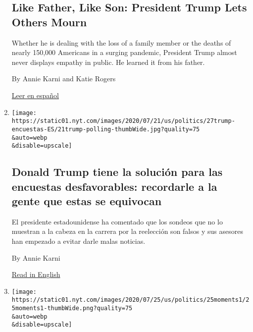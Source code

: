 \begin{enumerate}
  \hypertarget{like-father-like-son-president-trump-lets-others-mourn}{%
  \subsection{Like Father, Like Son: President Trump Lets Others
  Mourn}\label{like-father-like-son-president-trump-lets-others-mourn}}

  Whether he is dealing with the loss of a family member or the deaths
  of nearly 150,000 Americans in a surging pandemic, President Trump
  almost never displays empathy in public. He learned it from his
  father.

  By Annie Karni and Katie Rogers

  \href{https://www.nytimes.com/es/2020/07/31/espanol/estados-unidos/fred-trump-donald-trump.html}{Leer
  en español}
\item
  \href{/es/2020/07/27/espanol/estados-unidos/Trump-encuestas-elecciones.html}{}

  \texttt{[image: https://static01.nyt.com/images/2020/07/21/us/politics/27trump-encuestas-ES/21trump-polling-thumbWide.jpg?quality=75\\\&auto=webp\\\&disable=upscale]}

  \hypertarget{donald-trump-tiene-la-soluciuxf3n-para-las-encuestas-desfavorables-recordarle-a-la--gente-que-estas-se-equivocan}{%
  \subsection{Donald Trump tiene la solución para las encuestas
  desfavorables: recordarle a la~ gente que estas se
  equivocan}\label{donald-trump-tiene-la-soluciuxf3n-para-las-encuestas-desfavorables-recordarle-a-la--gente-que-estas-se-equivocan}}

  El presidente estadounidense ha comentado que los sondeos que no lo
  muestran a la cabeza en la carrera por la reelección son falsos y sus
  asesores han empezado a evitar darle malas noticias.

  By Annie Karni

  \href{https://www.nytimes.com/2020/07/22/us/politics/trump-polls-2020.html}{Read
  in English}
\item
  \href{/2020/07/25/us/politics/trump-biden-polls-coronavirus.html}{}

  \texttt{[image: https://static01.nyt.com/images/2020/07/25/us/politics/25moments1/25moments1-thumbWide.png?quality=75\\\&auto=webp\\\&disable=upscale]}

  \hypertarget{president-trump-bows-to-reality-this-week-in-the-2020-race}{%
}
\end{enumerate}
